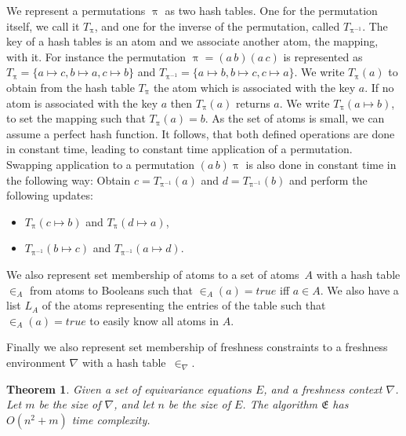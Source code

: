 \documentclass[11pt,a4paper]{amsart}
\newtheorem{theorem}{Theorem}
\theoremstyle{definition}
\newcommand{\swap}[2]{\ensuremath{(#1\, #2)}}
\newcommand\ppi{\uppi}
\newcommand{\msys}{\mathfrak{E}}
\newcommand{\mnabla}{\nabla}
\begin{document}
We represent a permutations $\ppi$ as two hash tables. One for the
permutation itself, we call it $T_\ppi$, and one for the inverse of
the permutation, called $T_{\ppi^{-1}}$. The key of a hash tables is
an atom and we associate another atom, the mapping, with it. For
instance the permutation $\ppi = \swap{a}{b}\swap{a}{c}$ is
represented as $T_\ppi=\{a\mapsto c, b\mapsto a, c\mapsto b\}$ and
$T_{\ppi^{-1}}=\{a\mapsto b, b\mapsto c, c\mapsto a\}$.  We write
$T_\ppi(a)$ to obtain from the hash table $T_\ppi$ the atom which is
associated with the key $a$. If no atom is associated with the key $a$
then $T_\ppi(a)$ returns $a$. We write $T_\ppi(a\mapsto b)$, to set
the mapping such that $T_\ppi(a) = b$.  As the set of atoms is small,
we can assume a perfect hash function. It follows, that both defined
operations are done in constant time, leading to constant time
application of a permutation. Swapping application to a permutation
$\swap{a}{b}\ppi$ is also done in constant time in the following way:
Obtain $c=T_{\ppi^{-1}}(a)$ and $d=T_{\ppi^{-1}}(b)$ and perform the
following updates:
\begin{itemize}
\item[(a)]
			$T_\ppi(c\mapsto b)$ and
			$T_\ppi(d\mapsto a)$,
\item[(b)]
			$T_{\ppi^{-1}}(b\mapsto c)$ and
			$T_{\ppi^{-1}}(a\mapsto d)$.
\end{itemize}

We also represent set membership of atoms to a set of atoms~$A$ with a
hash table $\in_A$ from atoms to Booleans such that $\in_A(a)=true$
iff $a\in A$. We also have a list $L_A$ of the atoms representing the
entries of the table such that $\in_A(a)=true$ to easily know all
atoms in $A$.

Finally we also represent set membership of freshness constraints to a freshness environment $\nabla$ with a hash table~$\in_\nabla$. 
\begin{theorem}\label{thm:match:complexity}
 Given a set of equivariance equations $E$, and a freshness context $\mnabla$.
Let $m$ be the size of $\mnabla$, and let $n$ be the size of $E$. The algorithm $\msys$ has $O(n^2 + m)$ time complexity.
\end{theorem}
\end{document}
